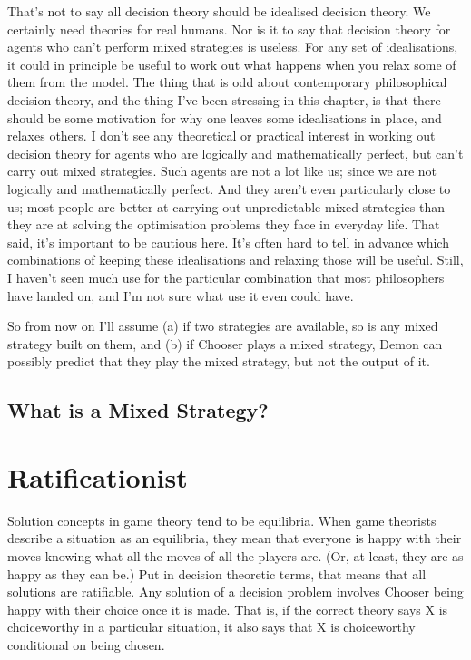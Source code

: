 \documentclass[
  12pt,
  letterpaper,
  DIV=11,
  numbers=noendperiod]{scrreprt}
\begin{document}
That's not to say all decision theory should be idealised decision
theory. We certainly need theories for real humans. Nor is it to say
that decision theory for agents who can't perform mixed strategies is
useless. For any set of idealisations, it could in principle be useful
to work out what happens when you relax some of them from the model. The
thing that is odd about contemporary philosophical decision theory, and
the thing I've been stressing in this chapter, is that there should be
some motivation for why one leaves some idealisations in place, and
relaxes others. I don't see any theoretical or practical interest in
working out decision theory for agents who are logically and
mathematically perfect, but can't carry out mixed strategies. Such
agents are not a lot like us; since we are not logically and
mathematically perfect. And they aren't even particularly close to us;
most people are better at carrying out unpredictable mixed strategies
than they are at solving the optimisation problems they face in everyday
life. That said, it's important to be cautious here. It's often hard to
tell in advance which combinations of keeping these idealisations and
relaxing those will be useful. Still, I haven't seen much use for the
particular combination that most philosophers have landed on, and I'm
not sure what use it even could have.

So from now on I'll assume (a) if two strategies are available, so is
any mixed strategy built on them, and (b) if Chooser plays a mixed
strategy, Demon can possibly predict that they play the mixed strategy,
but not the output of it.

\section{What is a Mixed Strategy?}\label{what-is-a-mixed-strategy}


\chapter{Ratificationist}\label{sec-ratify}

Solution concepts in game theory tend to be equilibria. When game
theorists describe a situation as an equilibria, they mean that everyone
is happy with their moves knowing what all the moves of all the players
are. (Or, at least, they are as happy as they can be.) Put in decision
theoretic terms, that means that all solutions are ratifiable. Any
solution of a decision problem involves Chooser being happy with their
choice once it is made. That is, if the correct theory says X is
choiceworthy in a particular situation, it also says that X is
choiceworthy conditional on being chosen.
\end{document}

